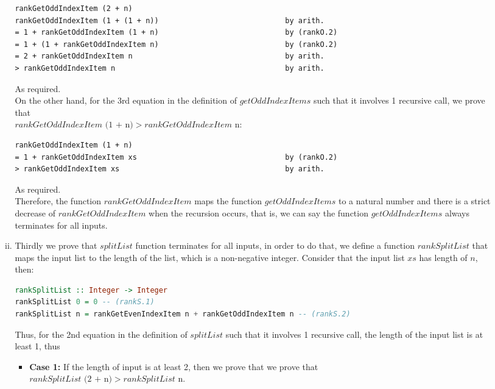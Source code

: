 \documentclass[11pt]{article}
\theoremstyle{definition}
\begin{document}
\begin{enumerate}
\begin{enumerate}[(a)]
\begin{enumerate}[i.]
\begin{verbatim}
rankGetOddIndexItem (2 + n)
rankGetOddIndexItem (1 + (1 + n))                             by arith.
= 1 + rankGetOddIndexItem (1 + n)                             by (rankO.2)
= 1 + (1 + rankGetOddIndexItem n)                             by (rankO.2)
= 2 + rankGetOddIndexItem n                                   by arith.
> rankGetOddIndexItem n                                       by arith.
\end{verbatim}
As required. \\
On the other hand, for the 3rd equation in the definition of $getOddIndexItems$ such that it involves 1 recursive call, 
we prove that \\
$rankGetOddIndexItem \text{ (1 + n)} > rankGetOddIndexItem \text{ n}$:

\begin{verbatim}
rankGetOddIndexItem (1 + n)
= 1 + rankGetOddIndexItem xs                                  by (rankO.2)
> rankGetOddIndexItem xs                                      by arith.
\end{verbatim}
As required. \\
Therefore, the function $rankGetOddIndexItem$ maps the function $getOddIndexItems$ to a natural number and there is a strict decrease of $rankGetOddIndexItem$ 
when the recursion occurs, that is, we can say the function $getOddIndexItems$ always terminates for all inputs.

\item Thirdly we prove that $splitList$ function terminates for all inputs, in order to do that, we define a 
function $rankSplitList$ that maps the input list to the length of the list, which is a non-negative integer.
Consider that the input list $xs$ has length of $n$, then:

\begin{lstlisting}[language=Haskell]
rankSplitList :: Integer -> Integer
rankSplitList 0 = 0	-- (rankS.1)
rankSplitList n = rankGetEvenIndexItem n + rankGetOddIndexItem n -- (rankS.2)
\end{lstlisting}

Thus, for the 2nd equation in the definition of $splitList$ such that it involves 1 recursive call, the length of the 
input list is at least 1, thus\\
\begin{itemize}
\item \textbf{Case 1:} If the length of input is at least 2, then we prove that we prove
that \\
$rankSplitList \text{ (2 + n)} > rankSplitList \text{ n}$.


\end{itemize}
\end{enumerate}
\end{enumerate}
\end{enumerate}
\end{document}
